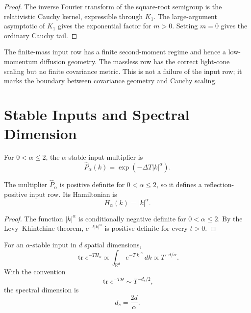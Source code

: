 \begin{proof}
The inverse Fourier transform of the square-root semigroup is the
relativistic Cauchy kernel, expressible through $K_1$. The large-argument
asymptotic of $K_1$ gives the exponential factor for $m>0$. Setting
$m=0$ gives the ordinary Cauchy tail.
\end{proof}

\begin{corollary}
\label{cor:innovation-input-dynamics-mass-variance-split}
The finite-mass input row has a finite second-moment regime and hence a
low-momentum diffusion geometry. The massless row has the correct
light-cone scaling but no finite covariance metric. This is not a failure
of the input row; it marks the boundary between covariance geometry and
Cauchy scaling.
\end{corollary}

\section{Stable Inputs and Spectral Dimension}
\label{sec:innovation-input-dynamics-stable-spectral-dimension}

\begin{definition}
\label{def:innovation-input-dynamics-stable-input}
For $0<\alpha\le2$, the $\alpha$-stable input multiplier is
$$
\widehat P_\alpha(k)=\exp(-\Delta T|k|^\alpha).
$$
\end{definition}

\begin{theorem}
\label{thm:innovation-input-dynamics-stable-positive-row}
The multiplier $\widehat P_\alpha$ is positive definite for
$0<\alpha\le2$, so it defines a reflection-positive input row. Its
Hamiltonian is
$$
H_\alpha(k)=|k|^\alpha.
$$
\end{theorem}

\begin{proof}
The function $|k|^\alpha$ is conditionally negative definite for
$0<\alpha\le2$. By the Levy--Khintchine theorem,
$e^{-t|k|^\alpha}$ is positive definite for every $t>0$.
\end{proof}

\begin{theorem}
\label{thm:innovation-input-dynamics-spectral-dimension}
For an $\alpha$-stable input in $d$ spatial dimensions,
$$
\operatorname{tr}e^{-TH_\alpha}
\propto
\int_{\mathbb R^d}e^{-T|k|^\alpha}\,dk
\propto
T^{-d/\alpha}.
$$
With the convention
$$
\operatorname{tr}e^{-TH}\sim T^{-d_s/2},
$$
the spectral dimension is
$$
d_s=\frac{2d}{\alpha}.
$$
\end{theorem}

